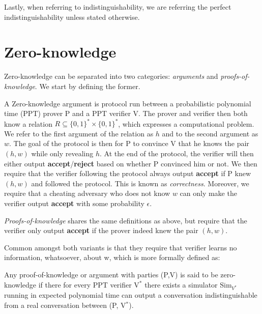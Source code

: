 Lastly, when referring to indistinguishability, we are referring the perfect
indistinguishability unless stated otherwise.

\section{Zero-knowledge}
\label{sec:background:zero-knowledge}
Zero-knowledge can be separated into two categories: \textit{arguments} and
\textit{proofs-of-knowledge}. We start by defining the former.

A Zero-knowledge argument is protocol run between a probabilistic polynomial
time (PPT) prover P and a PPT verifier V. The prover and verifier then both
know a relation $R \subseteq \{0,1\}^{*} \times \{0,1\}^*$, which expresses a
computational problem. We refer to the first argument of the relation as $h$ and
to the second argument as $w$.
The goal of the protocol is then for P to convince V that he knows the pair
$(h,w)$ while only revealing $h$. At the end of the protocol, the verifier will
then either output \textbf{accept}/\textbf{reject} based on whether P convinced
him or not.
We then require that the verifier following the protocol always output
\textbf{accept} if P knew $(h,w)$ and followed the protocol. This is known as \textit{correctness}.
Moreover, we require that a cheating adversary who does not know $w$ can
only make the verifier output \textbf{accept} with some probability $\epsilon$.

\textit{Proofs-of-knowledge} shares the same definitions
as above, but require that the verifier only output \textbf{accept} if the
prover indeed knew the pair $(h,w)$.


Common amongst both variants is that they require that verifier learns no
information, whatsoever, about w, which is more formally defined as:

\begin{definition}
  \label{def:zk}
  Any proof-of-knowledge or argument with parties (P,V) is said to be
  zero-knowledge if there for every PPT verifier V$^{*}$ there exists a
  simulator $\text{Sim}_{V^{*}}$ running in expected polynomial time can output a
  conversation indistinguishable from a real conversation between (P, V$^{*}$).
\end{definition}


